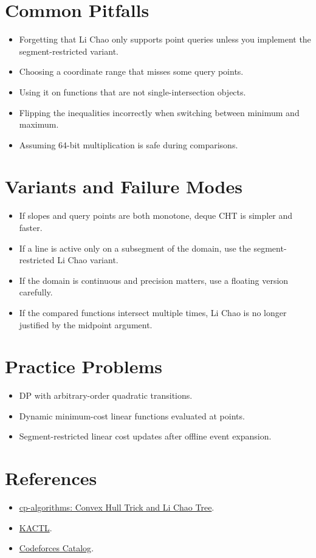 \section*{Common Pitfalls}

\begin{itemize}
  \item Forgetting that Li Chao only supports point queries unless you implement the segment-restricted variant.
  \item Choosing a coordinate range that misses some query points.
  \item Using it on functions that are not single-intersection objects.
  \item Flipping the inequalities incorrectly when switching between minimum and maximum.
  \item Assuming 64-bit multiplication is safe during comparisons.
\end{itemize}

\section*{Variants and Failure Modes}

\begin{itemize}
  \item If slopes and query points are both monotone, deque CHT is simpler and faster.
  \item If a line is active only on a subsegment of the domain, use the segment-restricted Li Chao variant.
  \item If the domain is continuous and precision matters, use a floating version carefully.
  \item If the compared functions intersect multiple times, Li Chao is no longer justified by the midpoint argument.
\end{itemize}

\section*{Practice Problems}

\begin{itemize}
  \item DP with arbitrary-order quadratic transitions.
  \item Dynamic minimum-cost linear functions evaluated at points.
  \item Segment-restricted linear cost updates after offline event expansion.
\end{itemize}

\section*{References}

\begin{itemize}
  \item \href{https://cp-algorithms.com/geometry/convex_hull_trick.html}{cp-algorithms: Convex Hull Trick and Li Chao Tree}.
  \item \href{https://github.com/kth-competitive-programming/kactl}{KACTL}.
  \item \href{https://codeforces.com/catalog}{Codeforces Catalog}.
\end{itemize}
